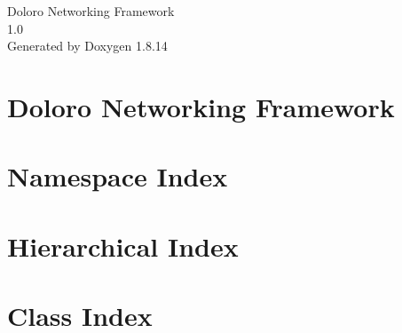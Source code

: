 \documentclass[twoside]{book}
\newcommand{\+}{\discretionary{\mbox{\scriptsize$\hookleftarrow$}}{}{}}
\newcommand{\clearemptydoublepage}{%
  \newpage{\pagestyle{empty}\cleardoublepage}%
}
\begin{document}
\hypersetup{pageanchor=false,
             bookmarksnumbered=true,
             pdfencoding=unicode
            }
\begin{titlepage}
\vspace*{7cm}
\begin{center}%
{\Large Doloro Networking Framework \\[1ex]\large 1.\+0 }\\
\vspace*{1cm}
{\large Generated by Doxygen 1.8.14}\\
\end{center}
\end{titlepage}
\clearemptydoublepage
{}
\tableofcontents
\clearemptydoublepage
{}
\hypersetup{pageanchor=true}

\chapter{Doloro Networking Framework}
\label{md__d_1__work__git_hub_doloro-networking-framework__r_e_a_d_m_e}

\chapter{Namespace Index}

\chapter{Hierarchical Index}

\chapter{Class Index}

\end{document}
